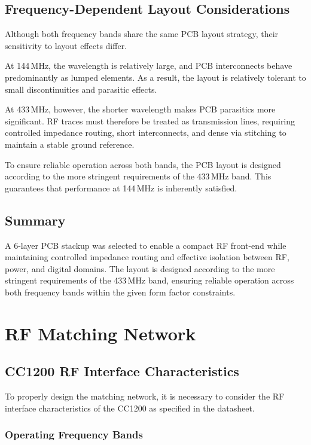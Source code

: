 \subsection{Frequency-Dependent Layout Considerations}

Although both frequency bands share the same PCB layout strategy, their sensitivity to layout effects differ.

At 144\,MHz, the wavelength is relatively large, and PCB interconnects behave predominantly as lumped elements. As a result, the layout is relatively tolerant to small discontinuities and parasitic effects.

At 433\,MHz, however, the shorter wavelength makes PCB parasitics more significant. RF traces must therefore be treated as transmission lines, requiring controlled impedance routing, short interconnects, and dense via stitching to maintain a stable ground reference.

To ensure reliable operation across both bands, the PCB layout is designed according to the more stringent requirements of the 433\,MHz band. This guarantees that performance at 144\,MHz is inherently satisfied.

\subsection{Summary}

A 6-layer PCB stackup was selected to enable a compact RF front-end while maintaining controlled impedance routing and effective isolation between RF, power, and digital domains. The layout is designed according to the more stringent requirements of the 433\,MHz band, ensuring reliable operation across both frequency bands within the given form factor constraints.

\section{RF Matching Network}
\label{sec:rf_matching}

\subsection{CC1200 RF Interface Characteristics}
\label{sec:cc1200_rf_characteristics}

To properly design the matching network, it is necessary to consider the RF interface characteristics of the CC1200 as specified in the datasheet.

\subsubsection{Operating Frequency Bands}


